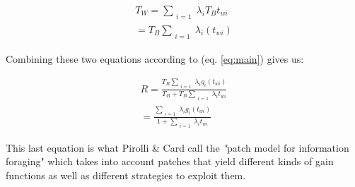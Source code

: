 \documentclass{mproj}
\begin{document}
\begin{equation}
\begin{split}
T_W = \sum_{\substack{i=1}} \lambda_i T_B t_{wi} \\
= T_B  \sum_{\substack{i=1}} \lambda_i (t_{wi})
\end{split}
\end{equation}

Combining these two equations according to (eq. \ref{eq:main}) gives us:

\begin{equation}
\begin{split}
R = \frac{T_B \sum_{\substack{i=1}} \lambda_i g_i (t_{wi})}{T_B + T_B  \sum_{\substack{i=1}} \lambda_i t_{wi} } \\
= \frac{\sum_{\substack{i=1}} \lambda_i g_i (t_{wi})}{1 + \sum_{\substack{i=1}} \lambda_i t_{wi} }
\end{split}
\end{equation}

This last equation is what Pirolli \& Card call the \emph"patch model for information foraging" which takes into account patches that yield different kinds of gain functions as well as different strategies to exploit them.
\end{document}
